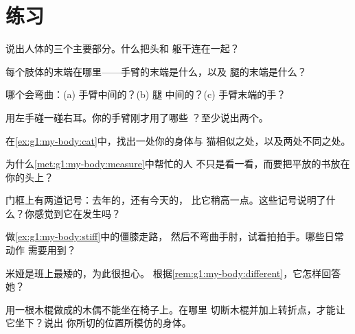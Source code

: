 \section{练习}

\begin{exercise}[$\star$]\label{exo:g1:my-body:1}
说出人体的三个主要部分。什么把头和
躯干连在一起？
\end{exercise}

\begin{exercise}[$\star$]\label{exo:g1:my-body:2}
每个肢体的末端在哪里——手臂的末端是什么，以及
腿的末端是什么？
\end{exercise}

\begin{exercise}[$\star$]\label{exo:g1:my-body:3}
哪个会弯曲：(a) 手臂中间的？(b) 腿
中间的？(c) 手臂末端的手？
\end{exercise}

\begin{exercise}[$\star$]\label{exo:g1:my-body:4}
用左手碰一碰右耳。你的手臂刚才用了哪些
？至少说出两个。
\end{exercise}

\begin{exercise}[$\star$]\label{exo:g1:my-body:5}
在\cref{ex:g1:my-body:cat}中，找出一处你的身体与
猫相似之处，以及两处不同之处。
\end{exercise}

\begin{exercise}[$\star$]\label{exo:g1:my-body:6}
为什么\cref{met:g1:my-body:measure}中帮忙的人
不只是看一看，而要把平放的书放在你的头上？
\end{exercise}

\begin{exercise}[$\star$]\label{exo:g1:my-body:7}
门框上有两道记号：去年的，还有今天的，
比它稍高一点。这些记号说明了什么？你感觉到它在发生吗？
\end{exercise}

\begin{exercise}[$\star$]\label{exo:g1:my-body:8}
做\cref{ex:g1:my-body:stiff}中的僵膝走路，
然后不弯曲手肘，试着拍拍手。哪些日常动作
需要用到？
\end{exercise}

\begin{exercise}[$\star\star$]\label{exo:g1:my-body:9}
米娅是班上最矮的，为此很担心。
根据\cref{rem:g1:my-body:different}，它怎样回答她？
\end{exercise}

\begin{exercise}[$\star\star$]\label{exo:g1:my-body:10}
用一根木棍做成的木偶不能坐在椅子上。在哪里
切断木棍并加上转折点，才能让它坐下？说出
你所切的位置所模仿的身体。
\end{exercise}
